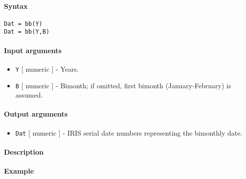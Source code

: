 


	\paragraph{Syntax}

\begin{verbatim}
Dat = bb(Y)
Dat = bb(Y,B)
\end{verbatim}

\paragraph{Input arguments}

\begin{itemize}
\item
  \texttt{Y} {[} numeric {]} - Years.
\item
  \texttt{B} {[} numeric {]} - Bimonth; if omitted, first bimonth
  (January-February) is assumed.
\end{itemize}

\paragraph{Output arguments}

\begin{itemize}
\itemsep1pt\parskip0pt
\item
  \texttt{Dat} {[} numeric {]} - IRIS serial date numbers representing
  the bimonthly date.
\end{itemize}

\paragraph{Description}

\paragraph{Example}


